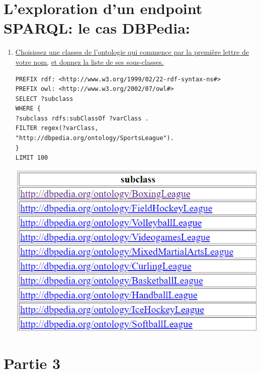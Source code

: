 \documentclass[12pt,a4paper]{article}
\begin{document}
    \section{L'exploration d'un endpoint SPARQL: le cas DBPedia: }
    \begin{justify}
        \begin{enumerate}
            \item \underline{Choisissez une classes de l\rq{ontologie} qui commence par la premi\`ere lettre de votre nom,} \underline{et donnez la liste de
            ses sous-classes.} \\
            \begin{verbatim}
PREFIX rdf: <http://www.w3.org/1999/02/22-rdf-syntax-ns#>
PREFIX owl: <http://www.w3.org/2002/07/owl#>
SELECT ?subclass
WHERE {
?subclass rdfs:subClassOf ?varClass .
FILTER regex(?varClass, "http://dbpedia.org/ontology/SportsLeague").
}
LIMIT 100
            \end{verbatim}
            \begin{center}
                \includegraphics{Quest31}
            \end{center}
        \end{enumerate}
    \end{justify}


    \section{Partie 3}
\end{document}
